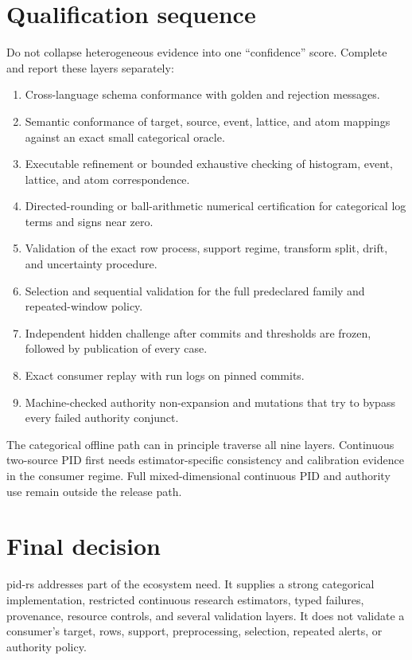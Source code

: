 \documentclass[11pt]{article}
\begin{document}
\section{Qualification sequence}

Do not collapse heterogeneous evidence into one ``confidence'' score.  Complete
and report these layers separately:

\begin{enumerate}
\item Cross-language schema conformance with golden and rejection messages.
\item Semantic conformance of target, source, event, lattice, and atom mappings against an exact small categorical oracle.
\item Executable refinement or bounded exhaustive checking of histogram, event, lattice, and atom correspondence.
\item Directed-rounding or ball-arithmetic numerical certification for categorical log terms and signs near zero.
\item Validation of the exact row process, support regime, transform split, drift, and uncertainty procedure.
\item Selection and sequential validation for the full predeclared family and repeated-window policy.
\item Independent hidden challenge after commits and thresholds are frozen, followed by publication of every case.
\item Exact consumer replay with run logs on pinned commits.
\item Machine-checked authority non-expansion and mutations that try to bypass every failed authority conjunct.
\end{enumerate}

The categorical offline path can in principle traverse all nine layers.
Continuous two-source PID first needs estimator-specific consistency and
calibration evidence in the consumer regime.  Full mixed-dimensional continuous
PID and authority use remain outside the release path.

\section{Final decision}

pid-rs addresses part of the ecosystem need.  It supplies a strong categorical
implementation, restricted continuous research estimators, typed failures,
provenance, resource controls, and several validation layers.  It does not
validate a consumer's target, rows, support, preprocessing, selection, repeated
alerts, or authority policy.
\end{document}
